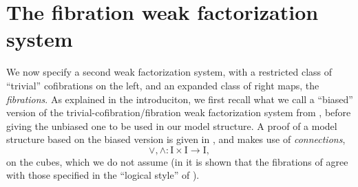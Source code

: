 \documentclass[12pt]{article}
\newcommand{\ra}{\ensuremath{\rightarrow}}
\newcommand{\too}{\ensuremath{\longrightarrow}}
\newcommand{\I}{\ensuremath{\mathrm{I}}}
\theoremstyle{remark}
\theoremstyle{definition}
\begin{document}
%

\section{The fibration weak factorization system}\label{FWFS}

We now specify a second weak factorization system, with a restricted class of ``trivial'' cofibrations on the left, and an expanded class of right maps, the \emph{fibrations}.  As explained in the introduciton, we first recall what we call a ``biased'' version of the trivial-cofibration/fibration weak factorization system from \cite{GS}, before giving the unbiased one to be used in our model structure.   A proof of a model structure based on the biased version is given in \cite{Sattler}, and makes use  of \emph{connections}, $$\vee,\wedge : \I\times\I \too \I,$$ on the cubes, which we do not assume (in \cite{AGH} it is shown that the fibrations of \cite{GS} agree with those specified in the ``logical style'' of \cite{CCHM,OP}).  
\end{document}

